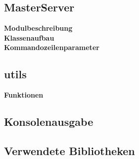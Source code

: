 \documentclass[a4paper,12pt]{article}
\begin{document}
\subsection{MasterServer}
\textbf{Modulbeschreibung}\\
\textbf{Klassenaufbau}\\
\textbf{Kommandozeilenparameter}\\ 
\subsection{utils}
\textbf{Funktionen}\\
\subsection{Konsolenausgabe}
\newpage
\noindent
\subsection{Verwendete Bibliotheken}
\end{document}
